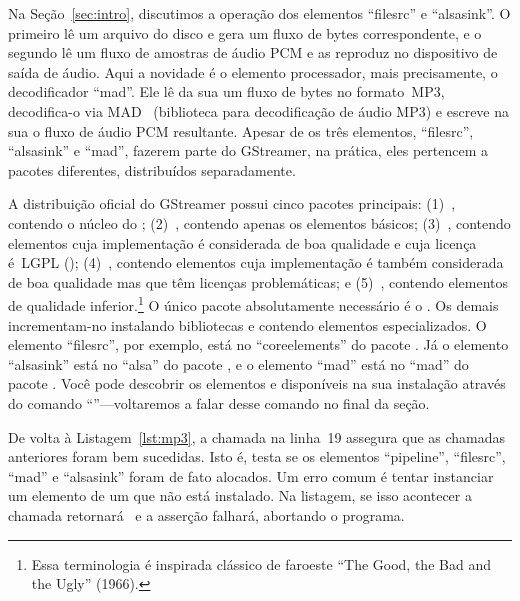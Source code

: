 \documentclass{SBCbookchapter}
\begin{document}


Na Seção~\ref{sec:intro}, discutimos a operação dos elementos ``filesrc'' e
``alsasink''.  O primeiro lê um arquivo do disco e gera um fluxo de bytes
correspondente, e o segundo lê um fluxo de amostras de áudio PCM e as
reproduz no dispositivo de saída de áudio.  Aqui a novidade é o elemento
processador, mais precisamente, o decodificador ``mad''.  Ele lê da sua
 um fluxo de bytes no formato~MP3, decodifica-o via
MAD~\cite{mad} (biblioteca para decodificação de áudio MP3) e escreve na sua
 o fluxo de áudio PCM resultante.  Apesar de os três elementos,
``filesrc'', ``alsasink'' e ``mad'', fazerem parte do GStreamer, na prática,
eles pertencem a pacotes diferentes, distribuídos separadamente.

A distribuição oficial do GStreamer possui cinco pacotes principais:
(1)~, contendo o núcleo do ;
(2)~, contendo apenas os elementos básicos;
(3)~, contendo elementos cuja implementação é
considerada de boa qualidade e cuja licença é~LGPL (); (4)~, contendo elementos cuja
implementação é também considerada de boa qualidade mas que têm licenças
problemáticas; e (5)~, contendo elementos de qualidade
inferior.\footnote{Essa terminologia é inspirada clássico de faroeste ``The
  Good, the Bad and the Ugly'' (1966).}  O único pacote absolutamente
necessário é o .  Os demais incrementam-no instalando
bibliotecas e  contendo elementos especializados.  O elemento
``filesrc'', por exemplo, está no  ``coreelements'' do pacote
.  Já o elemento ``alsasink'' está no  ``alsa'' do
pacote , e o elemento ``mad'' está no 
``mad'' do pacote .  Você pode descobrir os elementos e
 disponíveis na sua instalação através do comando
``''---voltaremos a falar desse comando no final da seção.

De volta à Listagem~\ref{lst:mp3}, a chamada  na linha~19
assegura que as chamadas  anteriores foram bem
sucedidas.  Isto é, testa se os elementos ``pipeline'', ``filesrc'', ``mad''
e ``alsasink'' foram de fato alocados.  Um erro comum é tentar instanciar um
elemento de um  que não está instalado.  Na listagem, se isso
acontecer a chamada  retornará~ e a
asserção falhará, abortando o programa.
\end{document}
